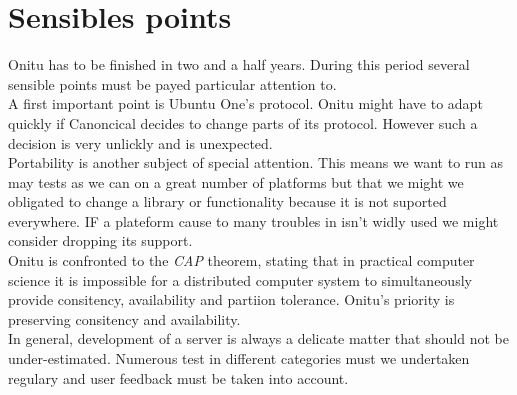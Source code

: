 \section{Sensibles points}
Onitu has to be finished in two and a half years. During this period several sensible points must be payed particular attention to.\\

A first important point is Ubuntu One's protocol. Onitu might have to adapt quickly if Canoncical decides to change parts of its protocol. However such a decision is very unlickly and is unexpected.\\

Portability is another subject of special attention. This means we want to run as may tests as we can on a great number of platforms but that we might we obligated to change a library or functionality because it is not suported everywhere. IF a plateform cause to many troubles in isn't widly used we might consider dropping its support.\\

Onitu is confronted to the \textit{CAP} theorem, stating that in practical computer science it is impossible for a distributed computer system to simultaneously provide consitency, availability and partiion tolerance. Onitu's priority is preserving consitency and availability.\\

In general, development of a server is always a delicate matter that should not be under-estimated. Numerous test in different categories must we undertaken regulary and user feedback must be taken into account.
